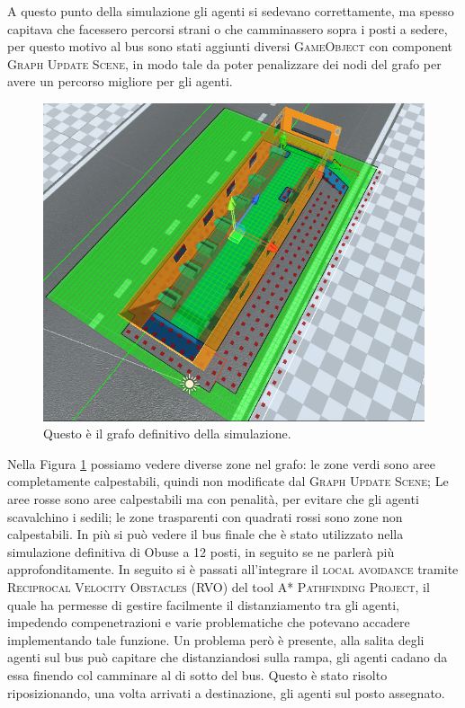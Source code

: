 \documentclass[12pt, openany]{book}
\begin{document}
A questo punto della simulazione gli agenti si sedevano correttamente, ma spesso capitava che facessero percorsi strani o che camminassero sopra i posti a sedere, per questo motivo al bus sono stati aggiunti diversi \textsc{GameObject} con component \textsc{Graph Update Scene}, in modo tale da poter penalizzare dei nodi del grafo per avere un percorso migliore per gli agenti.
\begin{figure}[H]
	\centering
	\includegraphics[width=1\linewidth]{"Immagini/AreaGrafo.png"}
	\caption{Questo è il grafo definitivo della simulazione.}
	\label{fig:AreaGrafo}
\end{figure}
Nella Figura \ref{fig:AreaGrafo} possiamo vedere diverse zone nel grafo: le zone verdi sono aree completamente calpestabili, quindi non modificate dal \textsc{Graph Update Scene}; Le aree rosse sono aree calpestabili ma con penalità, per evitare che gli agenti scavalchino i sedili; le zone trasparenti con quadrati rossi sono zone non calpestabili. In più si può vedere il bus finale che è stato utilizzato nella simulazione definitiva di Obuse a 12 posti, in seguito se ne parlerà più approfonditamente.
In seguito si è passati all'integrare il \textsc{local avoidance} tramite \textsc{Reciprocal Velocity Obstacles (RVO)} del tool \textsc{A* Pathfinding Project}, il quale ha permesse di gestire facilmente il distanziamento tra gli agenti, impedendo compenetrazioni e varie problematiche che potevano accadere implementando tale funzione. Un problema però è presente, alla salita degli agenti sul bus può capitare che distanziandosi sulla rampa, gli agenti cadano da essa finendo col camminare al di sotto del bus. Questo è stato risolto riposizionando, una volta arrivati a destinazione, gli agenti sul posto assegnato.
\end{document}
